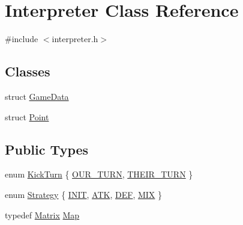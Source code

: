\hypertarget{classInterpreter}{
\section{Interpreter Class Reference}
\label{classInterpreter}
}


{\ttfamily \#include $<$interpreter.h$>$}

\subsection*{Classes}
\begin{DoxyCompactItemize}
\item 
struct \hyperlink{structInterpreter_1_1GameData}{GameData}
\item 
struct \hyperlink{structInterpreter_1_1Point}{Point}
\end{DoxyCompactItemize}
\subsection*{Public Types}
\begin{DoxyCompactItemize}
\item 
enum \hyperlink{classInterpreter_ac7c3ba77d973ffbb84b12db662cfe643}{KickTurn} \{ \hyperlink{classInterpreter_ac7c3ba77d973ffbb84b12db662cfe643a8c18a3c8b220a0c8166c1ee4b3504ebe}{OUR\_\-TURN}, 
\hyperlink{classInterpreter_ac7c3ba77d973ffbb84b12db662cfe643ac196847925fbe4bc38ee72b9b97d0f76}{THEIR\_\-TURN}
 \}
\item 
enum \hyperlink{classInterpreter_a0fb49436c8c14ca79e13f1cd78119088}{Strategy} \{ \hyperlink{classInterpreter_a0fb49436c8c14ca79e13f1cd78119088af1c3928f408be0d85ce73e1686e519d9}{INIT}, 
\hyperlink{classInterpreter_a0fb49436c8c14ca79e13f1cd78119088a8bf993c8b673e31f609171552d65c4c4}{ATK}, 
\hyperlink{classInterpreter_a0fb49436c8c14ca79e13f1cd78119088ae58df17fd988314c295b980f6a5a6a75}{DEF}, 
\hyperlink{classInterpreter_a0fb49436c8c14ca79e13f1cd78119088a5509091a7f3746995da83c92dd449187}{MIX}
 \}
\item 
typedef \hyperlink{classMatrix}{Matrix} \hyperlink{classInterpreter_a4c080f069f557cf92dfe803117a6ea53}{Map}
\end{DoxyCompactItemize}
